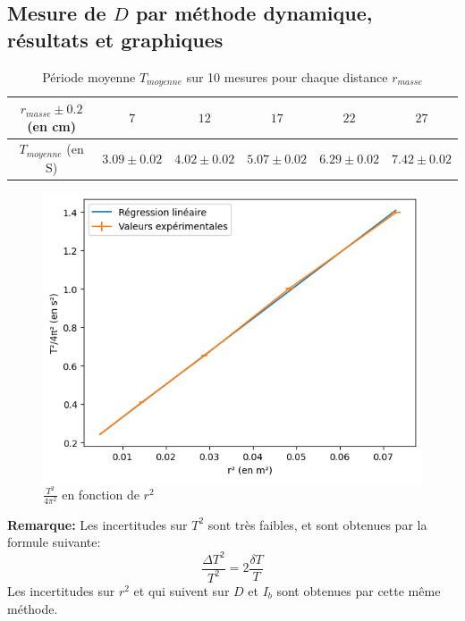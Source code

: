 \documentclass[12pt]{article}
\begin{document}
\subsection{Mesure de $D$ par méthode dynamique, résultats et graphiques}
\label{section:D_dynamique}
\begin{table}[h!]
	\centering
	\begin{tabular}{||c | c c c c c||} 
		\hline
		$r_{masse} \pm 0.2$ (en cm) & $7$ & $12$ & $17$ & $22$ & $27$ \\
		\hline
        $T_{moyenne}$ (en S) & $3.09 \pm 0.02$ & $4.02 \pm 0.02$ & $5.07 \pm 0.02$ & $6.29 \pm 0.02$ & $7.42 \pm 0.02$\\
        \hline
    \end{tabular}
	\caption{Période moyenne $T_{moyenne}$ sur 10 mesures pour chaque distance $r_{masse}$}
	\label{table:mesure_D_dynamique}
\end{table}
\begin{figure}[h!]
    \begin{center}
        \includegraphics*[scale=1]{img/D_dynamique.png}
    \end{center}
    \caption{$\frac{T^2}{4\pi^2}$ en fonction de $r^2$}
    \label{fig:graphe_T}
\end{figure}

\textbf{Remarque:} Les incertitudes sur $T^2$ sont très faibles, et sont obtenues par la formule suivante:
\begin{equation}
    \frac{\Delta T^2}{T^2} = 2 \frac{\delta T}{T}
\end{equation}
Les incertitudes sur $r^2$ et qui suivent sur $D$ et $I_b$ sont obtenues par cette même méthode.
\end{document}
